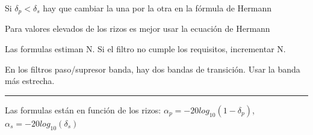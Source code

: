 \begin{frame}
\begin{itemize}
\begin{itemize}
\end{itemize}
\vspace{-0.3cm}
\scriptsize{
\item Si $\delta_p < \delta_s$ hay que cambiar la una por la otra en la fórmula de Hermann
\item Para valores elevados de los rizos es mejor usar la ecuación de Hermann
\item Las formulas estiman N.  Si el filtro no cumple los requisitos, incrementar  N.
\item En los filtros paso/supresor banda, hay dos bandas de transición. Usar la banda más estrecha.}
\end{itemize}

\vspace{-0.4cm}

\rule{12cm}{0.4pt}

\scriptsize

Las formulas están en función de los rizos: $\alpha_p=-20 log_10(1-\delta_p)$, $\alpha_s=-20 log_10(\delta_s)$

\end{frame}
